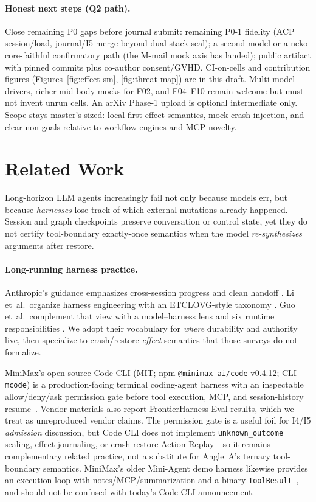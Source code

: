 \documentclass[11pt,a4paper]{article}
\begin{document}
\paragraph{Honest next steps (Q2 path).}
Close remaining P0 gaps before journal submit: remaining P0-1 fidelity
(ACP session/load, journal/I5 merge beyond dual-stack seal);
a second model or a neko-core-faithful confirmatory path (the M-mail mock
axis has landed);
public artifact with pinned commits plus co-author consent/GVHD.
CI-on-cells and contribution figures (Figures~\ref{fig:effect-sm},
\ref{fig:threat-map}) are in this draft. Multi-model drivers, richer
mid-body mocks for F02, and F04--F10 remain welcome but must not invent
unrun cells.
An arXiv Phase-1 upload is optional intermediate only. Scope stays
master's-sized: local-first effect semantics, mock crash injection, and
clear non-goals relative to workflow engines and MCP novelty.

\section{Related Work}
\label{sec:related}

Long-horizon LLM agents increasingly fail not only because models err, but
because \emph{harnesses} lose track of which external mutations already
happened. Session and graph checkpoints preserve conversation or control
state, yet they do not certify tool-boundary exactly-once semantics when
the model \emph{re-synthesizes} arguments after restore.

\paragraph{Long-running harness practice.}
Anthropic's guidance emphasizes cross-session progress and clean handoff
\cite{anthropic2025harnesses}. Li et~al.\ organize harness engineering with
an ETCLOVG-style taxonomy \cite{li2026harnesssurvey}. Guo et~al.\ complement
that view with a model--harness lens and six runtime responsibilities
\cite{guo2026fromqa}. We adopt their vocabulary for \emph{where} durability
and authority live, then specialize to crash/restore \emph{effect}
semantics that those surveys do not formalize.

MiniMax's open-source Code CLI (MIT; npm \texttt{@minimax-ai/code} v0.4.12; CLI \texttt{mcode})
is a production-facing terminal coding-agent harness with an inspectable
allow/deny/ask permission gate before tool execution, MCP, and session-history
resume~\cite{minimax2026codecli}. Vendor materials also report FrontierHarness
Eval results, which we treat as unreproduced vendor claims. The permission gate
is a useful foil for I4/I5 \emph{admission} discussion, but Code CLI does not
implement \texttt{unknown\_outcome} sealing, effect journaling, or crash-restore
Action Replay---so it remains complementary related practice, not a substitute
for Angle~A's ternary tool-boundary semantics. MiniMax's older Mini-Agent demo
harness likewise provides an execution loop with notes/MCP/summarization and a
binary \texttt{ToolResult}~\cite{minimax2026miniagent}, and should not be
confused with today's Code CLI announcement.
\end{document}

